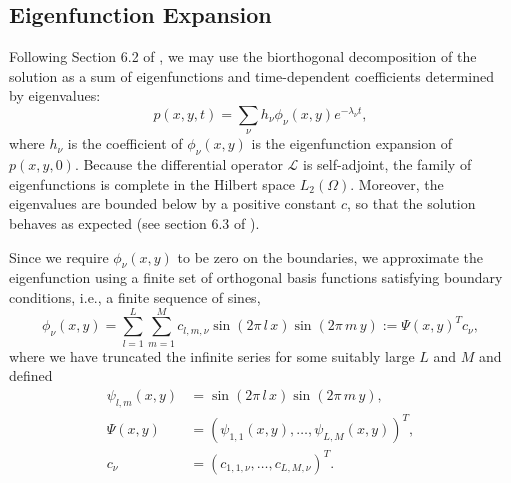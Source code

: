 \documentclass[10pt]{article}
\begin{document}
\subsection{Eigenfunction Expansion} \label{sec:eigenfunction}
Following Section 6.2 of \cite{risken1989fokker-planck}, we may use
the biorthogonal decomposition of the solution as a sum of
eigenfunctions and time-dependent coefficients determined by eigenvalues:
\begin{equation}
  p(x,y,t) =  \sum_\nu h_\nu \phi_\nu (x, y) e^{-\lambda_\nu t}, \label{eq:biorthogonal}
\end{equation}
where $h_\nu$ is the coefficient of $\phi_\nu(x, y)$ is the
eigenfunction expansion of $p(x,y,0)$. Because the differential
operator $\mathcal{L}$ is self-adjoint, the family of eigenfunctions
is complete in the Hilbert space $L_2(\Omega)$. Moreover, the
eigenvalues are bounded below by a positive constant $c$, so that the
solution behaves as expected (see section 6.3 of
\cite{risken1989fokker-planck}).

Since we require $\phi_\nu(x,y)$ to be zero on the boundaries, we
approximate the eigenfunction using a finite set of orthogonal basis
functions satisfying boundary conditions, i.e., a finite sequence of
sines,
\[
  \phi_\nu(x,y) = \sum_{l=1}^L \sum_{m=1}^M c_{l,m, \nu}
  \sin\left(2\pi\, l\, x \right) \sin\left(2\pi\, m\, y \right) := \Psi(x,y)^T c_\nu,
\]
where we have truncated the infinite series for some suitably large
$L$ and $M$ and defined
\begin{align*}
  \psi_{l,m}(x,y) &= \sin\left(2\pi\, l\, x \right)
                         \sin\left(2\pi\, m\, y \right), \\
  \Psi(x,y) &= (\psi_{1,1}(x,y), \ldots, \psi_{L,M}(x,y))^T, \\
  c_\nu &= (c_{1,1,\nu}, \ldots, c_{L,M,\nu})^T.
\end{align*}
\end{document}

